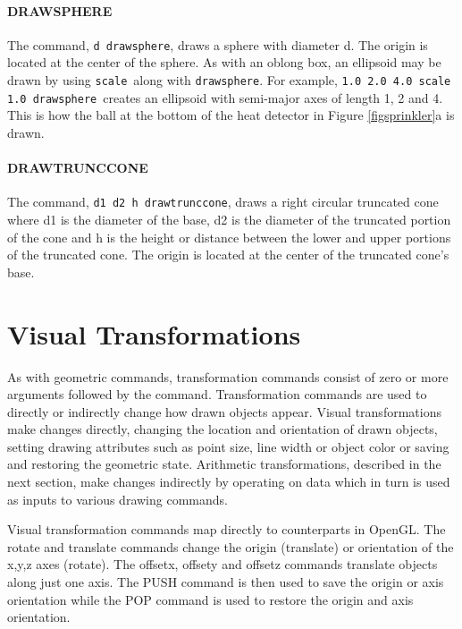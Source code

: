 \documentclass[11pt,twoside]{book}
\begin{document}
\paragraph{DRAWSPHERE} The command, {\tt d drawsphere},
draws a sphere with diameter d.  The origin is located at the
center of the sphere. As with an oblong box, an ellipsoid may be
drawn by using {\tt scale}\ along with {\tt drawsphere}. For
example, {\tt 1.0 2.0 4.0 scale 1.0 drawsphere}\ creates an
ellipsoid with semi-major axes of length 1, 2 and 4. This is how
the ball at the bottom of the heat detector in Figure \ref{figsprinkler}a is drawn.

\paragraph{DRAWTRUNCCONE} The command, {\tt d1 d2 h drawtrunccone},
draws a right circular truncated cone where d1 is the diameter of
the base, d2 is the diameter of the truncated portion of the cone
and h is the height or distance between the lower and upper
portions of the truncated cone.  The origin is located at the
center of the truncated cone's base.

\vspace{0.25in}
\section{Visual Transformations}
As with geometric commands, transformation commands consist of zero
or more arguments followed by the command. Transformation
commands are used to directly or indirectly change how drawn objects
appear.  Visual transformations make changes directly,
changing the location and orientation of drawn
objects,  setting drawing
attributes such as point size, line width or object color
or saving and restoring the geometric state.
Arithmetic transformations, described in the next section,
make changes indirectly by operating on
data which in turn is used as inputs to various drawing commands.

Visual transformation commands map directly to counterparts
in OpenGL.  The
rotate and translate commands change the origin (translate) or
orientation of the x,y,z axes (rotate).
The offsetx, offsety and offsetz commands translate
objects along just one axis.  The PUSH command is then
used to save the origin or axis orientation while the POP command
is used to restore the origin and axis orientation.
\end{document}

